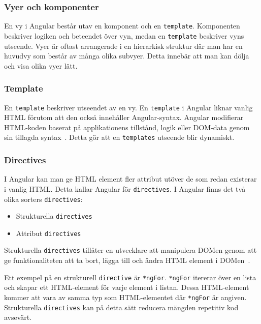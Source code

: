 
\subsubsection{Vyer och komponenter}
En vy i Angular består utav en komponent och en \texttt{template}. Komponenten beskriver logiken och beteendet över vyn, medan en \texttt{template} beskriver vyns utseende. Vyer är oftast arrangerade i en hierarkisk struktur där man har en huvudvy som består av många olika subvyer. Detta innebär att man kan dölja och visa olika vyer lätt. 

\subsubsection{Template}
\label{angular-template}
En \texttt{template} beskriver utseendet av en vy. En \texttt{template} i Angular liknar vanlig HTML förutom att den också innehåller Angular-syntax. Angular modifierar HTML-koden baserat på applikationens tillstånd, logik eller DOM-data genom sin tillagda syntax~\cite{angular-components}. Detta gör att en \texttt{templates} utseende blir dynamiskt.

\subsubsection{Directives}
I Angular kan man ge HTML element fler attribut utöver de som redan existerar i vanlig HTML. Detta kallar Angular för \texttt{directives}. I Angular finns det två olika sorters \texttt{directives}:
\begin{itemize}
    \item Strukturella \texttt{directives}
    \item Attribut \texttt{directives}
\end{itemize}
Strukturella \texttt{directives} tillåter en utvecklare att manipulera DOMen genom att ge funktionaliteten att ta bort, lägga till och ändra HTML element i DOMen~\cite{angular-services}.

Ett exempel på en strukturell \texttt{directive} är \texttt{*ngFor}. \texttt{*ngFor} itererar över en lista och skapar ett HTML-element för varje element i listan. Dessa HTML-element kommer att vara av samma typ som HTML-elementet där \texttt{*ngFor} är angiven. Strukturella \texttt{directives} kan på detta sätt reducera mängden repetitiv kod avsevärt.

